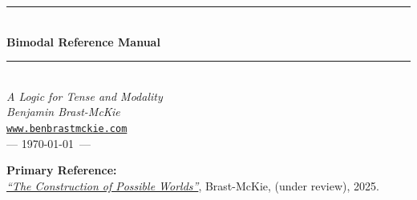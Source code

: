 \documentclass[11pt]{article}
\theoremstyle{definition}
\theoremstyle{plain}
\theoremstyle{remark}
\newcommand{\HRule}{\rule{\linewidth}{0.5mm}}
\begin{document}
\begin{titlepage}
\begin{center}

\vspace*{2cm}

\HRule\\[0.4cm]
{\Huge \bfseries Bimodal Reference Manual}\\[0.2cm]
\HRule\\[1cm]

{\LARGE\itshape A Logic for Tense and Modality}\\[1cm]


{\large\itshape Benjamin Brast-McKie}\\[0.15cm]
\texttt{\href{https://www.benbrastmckie.com}{www.benbrastmckie.com}}\\[0.15cm]
{--- \today\ ---}\\[1cm]

\vfill

{\normalsize\bfseries Primary Reference:}\\[0.3cm]
  \href{https://benbrastmckie.com/publications/possible_worlds.pdf}{\textit{``The Construction of Possible Worlds''}}, Brast-McKie, (under review), 2025.\\[1cm]

\end{center}
\end{titlepage}
\thispagestyle{empty}

{

\begin{abstract}
\noindent
This reference manual provides the formal specification of the Bimodal logic \textbf{TM} for tense and modality as implemented in the \proofchecker{} project.
\textbf{TM} is a bimodal logic combining an S5 historical necessity operator with linear temporal operators for the past and future tenses.
Soundness and the deduction theorem are established.
Completeness is proven via the semantic canonical model approach: the Lindenbaum lemma, truth lemma, and weak completeness theorem are all proven.
The key result \texttt{semantic\_weak\_completeness} demonstrates that validity implies derivability.
\end{abstract}

\pagestyle{empty}
\tableofcontents
\cleardoublepage
}









\end{document}
